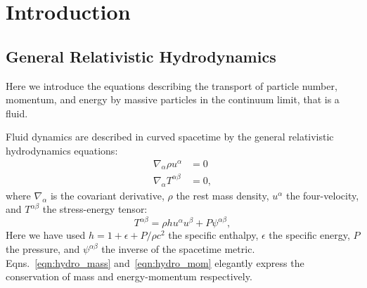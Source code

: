 \chapter{Introduction}
\label{chap:intro}



\section{General Relativistic Hydrodynamics}
\label{sec:gr_hydro}
Here we introduce the equations describing the transport of particle number,
momentum, and energy by massive particles in the continuum limit, that is
a fluid.

Fluid dynamics are described in curved spacetime by the general relativistic
hydrodynamics equations:
\begin{align}
  \label{eqn:hydro_mass}
  \nabla_\alpha \rho u^\alpha &= 0 \\
  \label{eqn:hydro_mom}
  \nabla_\alpha T^{\alpha\beta} &= 0,
\end{align}
where $\nabla_\alpha$ is the covariant derivative,
$\rho$ the rest mass density,
$u^\alpha$ the four-velocity,
and $T^{\alpha\beta}$ the stress-energy tensor:
\begin{equation}
  \label{eqn:stress_energy}
  T^{\alpha\beta} = \rho h u^\alpha u^\beta + P \psi^{\alpha\beta},
\end{equation}
Here we have used $h=1+\epsilon+P/\rho c^2$ the specific enthalpy,
$\epsilon$ the specific energy,
$P$ the pressure, and
$\psi^{\alpha\beta}$ the inverse of the spacetime metric.
Eqns.~\ref{eqn:hydro_mass} and~\ref{eqn:hydro_mom} elegantly express the
conservation of mass and energy-momentum respectively.

